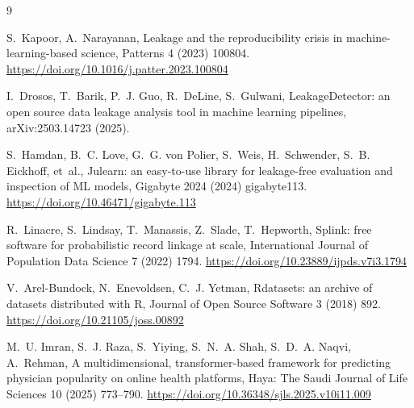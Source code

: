\documentclass[preprint,12pt]{elsarticle}
\begin{document}
\begin{thebibliography}{9}

S.~Kapoor, A.~Narayanan,
Leakage and the reproducibility crisis in machine-learning-based science,
Patterns 4 (2023) 100804.
\newblock \url{https://doi.org/10.1016/j.patter.2023.100804}

I.~Drosos, T.~Barik, P.~J. Guo, R.~DeLine, S.~Gulwani,
LeakageDetector: an open source data leakage analysis tool in machine learning
pipelines, arXiv:2503.14723 (2025).

S.~Hamdan, B.~C. Love, G.~G. von Polier, S.~Weis, H.~Schwender, S.~B. Eickhoff,
et~al.,
Julearn: an easy-to-use library for leakage-free evaluation and inspection of
ML models, Gigabyte 2024 (2024) gigabyte113.
\newblock \url{https://doi.org/10.46471/gigabyte.113}

R.~Linacre, S.~Lindsay, T.~Manassis, Z.~Slade, T.~Hepworth,
Splink: free software for probabilistic record linkage at scale,
International Journal of Population Data Science 7 (2022) 1794.
\newblock \url{https://doi.org/10.23889/ijpds.v7i3.1794}

V.~Arel-Bundock, N.~Enevoldsen, C.~J. Yetman,
Rdatasets: an archive of datasets distributed with R,
Journal of Open Source Software 3 (2018) 892.
\newblock \url{https://doi.org/10.21105/joss.00892}

M.~U. Imran, S.~J. Raza, S.~Yiying, S.~N.~A. Shah, S.~D.~A. Naqvi, A.~Rehman,
A multidimensional, transformer-based framework for predicting physician
popularity on online health platforms,
Haya: The Saudi Journal of Life Sciences 10 (2025) 773--790.
\newblock \url{https://doi.org/10.36348/sjls.2025.v10i11.009}

\end{thebibliography}
\end{document}
